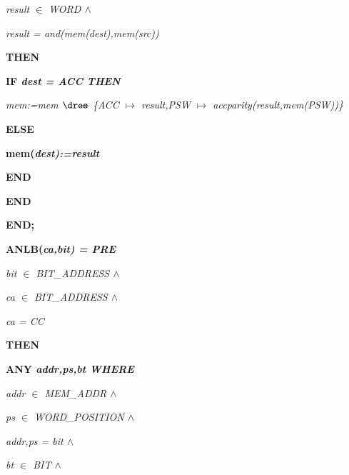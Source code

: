 \begin{sloppypar}
\hspace*{0.30in}\it result $\in$  \it WORD  $\land$ 

\hspace*{0.30in}\it result \rm = \it and\rm (\it mem\rm (\it dest\rm )\rm ,\it mem\rm (\it src\rm )\rm )

\hspace*{0.20in}\bf THEN

\hspace*{0.30in}\bf IF \it dest \rm = \it ACC \bf THEN

\hspace*{0.40in}\it mem\rm :=\it mem $\lover$ \rm \{\it ACC $\mapsto$ \it result\rm ,\it PSW $\mapsto$ \it accparity\rm (\it result\rm ,\it mem\rm (\it PSW\rm )\rm )\rm \}

\hspace*{0.30in}\bf ELSE

\hspace*{0.40in}\bf mem\rm (\it dest\rm )\rm :=\it result

\hspace*{0.30in}\bf END

\hspace*{0.20in}\bf END

\hspace*{0.10in}\bf END\rm ;

\hspace*{0.10in}\bf ANLB\rm (\it ca\rm ,\it bit\rm ) \rm = \bf PRE

\hspace*{0.20in}\it bit $\in$  \it BIT\_ADDRESS  $\land$ 

\hspace*{0.20in}\it ca $\in$  \it BIT\_ADDRESS  $\land$ 

\hspace*{0.20in}\it ca \rm = \it CC

\hspace*{0.10in}\bf THEN

\hspace*{0.20in}\bf ANY \it addr\rm ,\it ps\rm ,\it bt \bf WHERE

\hspace*{0.30in}\it addr $\in$  \it MEM\_ADDR  $\land$ 

\hspace*{0.30in}\it ps $\in$  \it WORD\_POSITION  $\land$ 

\hspace*{0.30in}\it addr\rm ,\it ps \rm = \it bit  $\land$ 

\hspace*{0.30in}\it bt $\in$  \it BIT  $\land$ 


\end{sloppypar}
